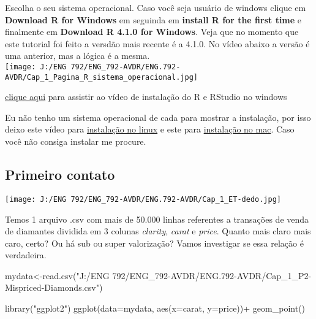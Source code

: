 \documentclass[
]{book}
\newenvironment{Shaded}{\begin{snugshade}}{\end{snugshade}}
\newcommand{\AttributeTok}[1]{\textcolor[rgb]{0.77,0.63,0.00}{#1}}
\newcommand{\FunctionTok}[1]{\textcolor[rgb]{0.00,0.00,0.00}{#1}}
\newcommand{\NormalTok}[1]{#1}
\newcommand{\OtherTok}[1]{\textcolor[rgb]{0.56,0.35,0.01}{#1}}
\newcommand{\SpecialCharTok}[1]{\textcolor[rgb]{0.00,0.00,0.00}{#1}}
\newcommand{\StringTok}[1]{\textcolor[rgb]{0.31,0.60,0.02}{#1}}
\begin{document}
Escolha o seu sistema operacional. Caso você seja usuário de windows clique em \textbf{Download R for Windows} em seguinda em \textbf{install R for the first time} e finalmente em \textbf{Download R 4.1.0 for Windows}. Veja que no momento que este tutorial foi feito a versdão mais recente é a 4.1.0. No vídeo abaixo a versão é uma anterior, mas a lógica é a mesma.\\
\texttt{[image: J:/ENG 792/ENG\_792-AVDR/ENG.792-AVDR/Cap\_1\_Pagina\_R\_sistema\_operacional.jpg]}

\href{https://sites.google.com/d/1eCt5C338czwUdwb5R-3k98vHFdf5LFC7/p/1l-WXVHDr8j6cYk-iTSYBaFN7mTesOmQl/edit}{clique aqui} para assistir ao vídeo de instalação do R e RStudio no windows

Eu não tenho um sistema operacional de cada para mostrar a instalação, por isso deixo este vídeo para \href{https://www.youtube.com/watch?v=np2-FIgzpTg\&ab_channel=AutoDeeDucks}{instalação no linux} e este para \href{https://www.youtube.com/watch?v=LanBozXJjOk\&ab_channel=DataSciencewithTom}{instalação no mac}. Caso você não consiga instalar me procure.

\hypertarget{primeiro-contato}{%
\subsection{Primeiro contato}\label{primeiro-contato}}

\texttt{[image: J:/ENG 792/ENG\_792-AVDR/ENG.792-AVDR/Cap\_1\_ET-dedo.jpg]}

Temos 1 arquivo .csv com mais de 50.000 linhas referentes a transações de venda de diamantes dividida em 3 colunas \emph{clarity}, \emph{carat} e \emph{price}. Quanto mais claro mais caro, certo? Ou há sub ou super valorização? Vamos investigar se essa relação é verdadeira.

\begin{Shaded}
\begin{Highlighting}[]
\NormalTok{mydata}\OtherTok{\textless{}{-}}\FunctionTok{read.csv}\NormalTok{(}\StringTok{"J:/ENG 792/ENG\_792{-}AVDR/ENG.792{-}AVDR/Cap\_1\_P2{-}Mispriced{-}Diamonds.csv"}\NormalTok{)}

\FunctionTok{library}\NormalTok{(}\StringTok{"ggplot2"}\NormalTok{)}
\FunctionTok{ggplot}\NormalTok{(}\AttributeTok{data=}\NormalTok{mydata, }\FunctionTok{aes}\NormalTok{(}\AttributeTok{x=}\NormalTok{carat, }\AttributeTok{y=}\NormalTok{price))}\SpecialCharTok{+} 
  \FunctionTok{geom\_point}\NormalTok{()}
\end{Highlighting}
\end{Shaded}
\end{document}
